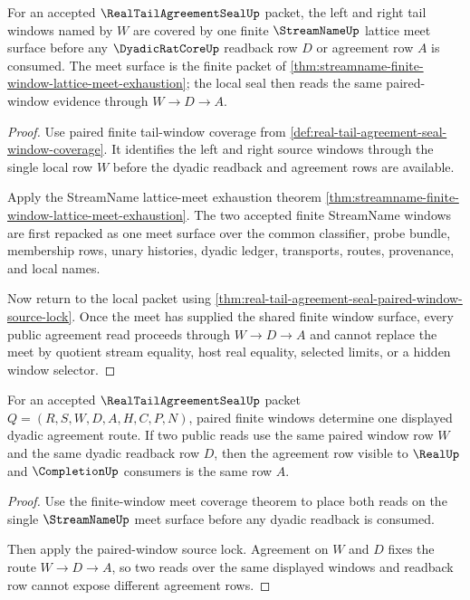 \begin{theorem}
\label{thm:real-tail-agreement-seal-window-meet-coverage}
For an accepted $\RealTailAgreementSealUp$ packet, the left and right tail windows named by $W$ are covered by one finite $\StreamNameUp$ lattice meet surface before any $\DyadicRatCoreUp$ readback row $D$ or agreement row $A$ is consumed. The meet surface is the finite packet of \autoref{thm:streamname-finite-window-lattice-meet-exhaustion}; the local seal then reads the same paired-window evidence through $W \to D \to A$.
\end{theorem}
\begin{proof}
Use paired finite tail-window coverage from \autoref{def:real-tail-agreement-seal-window-coverage}. It identifies the left and right source windows through the single local row $W$ before the dyadic readback and agreement rows are available.

Apply the StreamName lattice-meet exhaustion theorem \autoref{thm:streamname-finite-window-lattice-meet-exhaustion}. The two accepted finite StreamName windows are first repacked as one meet surface over the common classifier, probe bundle, membership rows, unary histories, dyadic ledger, transports, routes, provenance, and local names.

Now return to the local packet using \autoref{thm:real-tail-agreement-seal-paired-window-source-lock}. Once the meet has supplied the shared finite window surface, every public agreement read proceeds through $W \to D \to A$ and cannot replace the meet by quotient stream equality, host real equality, selected limits, or a hidden window selector.
\end{proof}

\begin{theorem}
\label{thm:real-tail-agreement-seal-window-route-determinacy-companion}
For an accepted $\RealTailAgreementSealUp$ packet $Q=(R,S,W,D,A,H,C,P,N)$, paired finite windows determine one displayed dyadic agreement route. If two public reads use the same paired window row $W$ and the same dyadic readback row $D$, then the agreement row visible to $\RealUp$ and $\CompletionUp$ consumers is the same row $A$.
\end{theorem}
\begin{proof}
Use the finite-window meet coverage theorem to place both reads on the single $\StreamNameUp$ meet surface before any dyadic readback is consumed.

Then apply the paired-window source lock. Agreement on $W$ and $D$ fixes the route $W \to D \to A$, so two reads over the same displayed windows and readback row cannot expose different agreement rows.
\end{proof}

